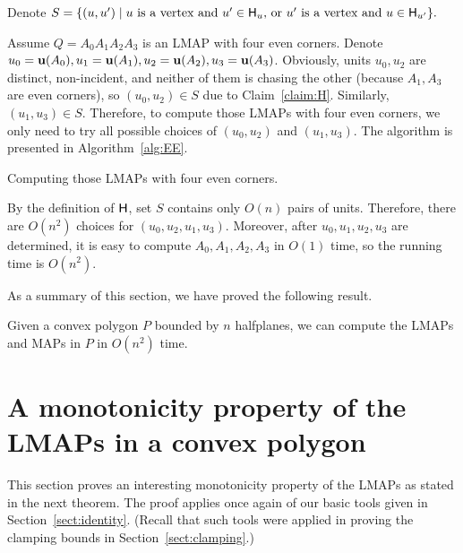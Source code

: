 \documentclass{ws-ijcga}
\begin{document}
Denote $S=\{(u,u')\mid \text{$u$ is a vertex and $u'\in \mathsf{H}_u$, or $u'$ is a vertex and $u\in \mathsf{H}_{u'}$}\}.$

Assume $Q=A_0A_1A_2A_3$ is an LMAP with four even corners.
Denote $u_0=\mathbf{u}(A_0),u_1=\mathbf{u}(A_1),u_2=\mathbf{u}(A_2),u_3=\mathbf{u}(A_3)$.
Obviously, units $u_0,u_2$ are distinct, non-incident, and neither of them is chasing the other (because $A_1,A_3$ are even corners), so $(u_0,u_2)\in S$ due to Claim~\ref{claim:H}.
Similarly, $(u_1,u_3)\in S$.
Therefore, to compute those LMAPs with four even corners, we only need to try all possible choices of $(u_0,u_2)$ and $(u_1,u_3)$.
The algorithm is presented in Algorithm~\ref{alg:EE}.

\begin{algorithm}[h]
\caption{Computing those LMAPs with four even corners.}\label{alg:EE}
\end{algorithm}

By the definition of $\mathsf{H}$, set $S$ contains only $O(n)$ pairs of units.
Therefore, there are $O(n^2)$ choices for $(u_0,u_2,u_1,u_3)$.
Moreover, after $u_0,u_1,u_2,u_3$ are determined, it is easy to compute $A_0,A_1,A_2,A_3$ in $O(1)$ time,
  so the running time is $O(n^2)$.
  
\smallskip As a summary of this section, we have proved the following result.
\begin{theorem}
Given a convex polygon $P$ bounded by $n$ halfplanes, we can compute the LMAPs and MAPs in $P$ in $O(n^2)$ time.
\end{theorem}

\section{A monotonicity property of the LMAPs in a convex polygon}\label{sect:interleave}

This section proves an interesting monotonicity property of the LMAPs as stated in the next theorem.
  The proof applies once again of our basic tools given in Section~\ref{sect:identity}.
    (Recall that such tools were applied in proving the clamping bounds in Section~\ref{sect:clamping}.)
\end{document}
